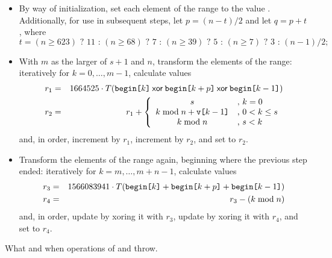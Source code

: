 \begin{itemdescr}
\begin{itemize}
 \item
   By way of initialization,
   set each element of the range to the value .
   Additionally,
   for use in subsequent steps,
   let $p = (n - t) / 2$
   and let $q = p + t$,
   where
   \[%
     t = (n \ge 623) \mbox{ ? } 11 \mbox{ : } (n \ge 68) \mbox{ ? } 7 \mbox{ : } (n \ge 39) \mbox{ ? } 5 \mbox{ : } (n \ge 7) \mbox{ ? } 3 \mbox{ : } (n - 1)/2;
   \]%
 \item
   With $m$ as the larger of $s + 1$ and $n$,
   transform the elements of the range:
   iteratively for $k = 0, \dotsc, m - 1$,
   calculate values
   \begin{eqnarray*}
     r_1 & = &
       1664525 \cdot T(    \texttt{begin[}k\texttt{]}
                      \mathbin{\mathsf{xor}} \texttt{begin[}k+p\texttt{]}
                      \mathbin{\mathsf{xor}} \texttt{begin[}k-1 \texttt{]}
                      )
     \\
     r_2 & = & r_1 + \left\{
       \begin{array}{cl}
         s                                  & \mbox{,  } k = 0
         \\
         k \bmod n + \texttt{v[}k-1\texttt{]} & \mbox{,  } 0 < k \le s
         \\
         k \bmod n                          & \mbox{,  } s < k
       \end{array}
     \right.
   \end{eqnarray*}
   and, in order,
   increment  by $r_1$,
   increment  by $r_2$,
   and
   set  to $r_2$.
 \item
   Transform the elements of the range again,
   beginning where the previous step ended:
   iteratively for $k = m, \dotsc, m + n - 1$,
   calculate values
   \begin{eqnarray*}
     r_3 & = &
       1566083941 \cdot T( \texttt{begin[}k  \texttt{]}
                         + \texttt{begin[}k+p\texttt{]}
                         + \texttt{begin[}k-1\texttt{]}
                         )
     \\
     r_4 & = & r_3 - (k \bmod n)
   \end{eqnarray*}
   and, in order,
   \noindent
   update  by xoring it with $r_3$,
   update  by xoring it with $r_4$,
   and
   set  to $r_4$.
\end{itemize}

\pnum\throws
What and when  operations of 
and  throw.
\end{itemdescr}

